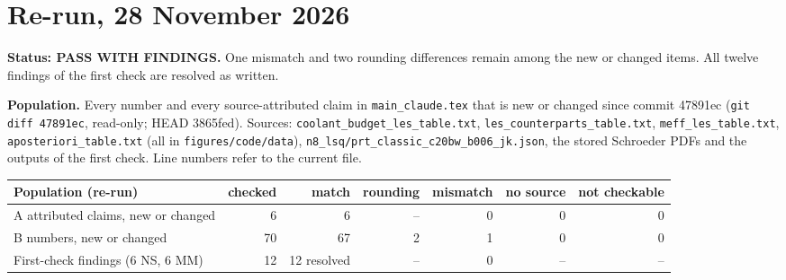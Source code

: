 \documentclass[10pt,a4paper]{article}
\begin{document}
\clearpage
\section*{Re-run, 28 November 2026}

\textbf{Status: PASS WITH FINDINGS.} One mismatch and two rounding differences remain among the new or changed
items. All twelve findings of the first check are resolved as written.

\textbf{Population.} Every number and every source-attributed claim in \texttt{main\_claude.tex} that is new or
changed since commit 47891ec (\texttt{git diff 47891ec}, read-only; HEAD 3865fed). Sources:
\texttt{coolant\_budget\_les\_table.txt}, \texttt{les\_counterparts\_table.txt}, \texttt{meff\_les\_table.txt},
\texttt{aposteriori\_table.txt} (all in \texttt{figures/code/data}), \texttt{n8\_lsq/prt\_classic\_c20bw\_b006\_jk.json},
the stored Schroeder PDFs and the outputs of the first check. Line numbers refer to the current file.

\begin{center}
\begin{tabular}{@{}l r r r r r r@{}}
\toprule
Population (re-run) & checked & match & rounding & mismatch & no source & not checkable \\
\midrule
A attributed claims, new or changed & 6 & 6 & -- & 0 & 0 & 0 \\
B numbers, new or changed & 70 & 67 & 2 & 1 & 0 & 0 \\
First-check findings (6 NS, 6 MM) & 12 & 12 resolved & -- & 0 & -- & -- \\
\bottomrule
\end{tabular}
\end{center}
\end{document}
